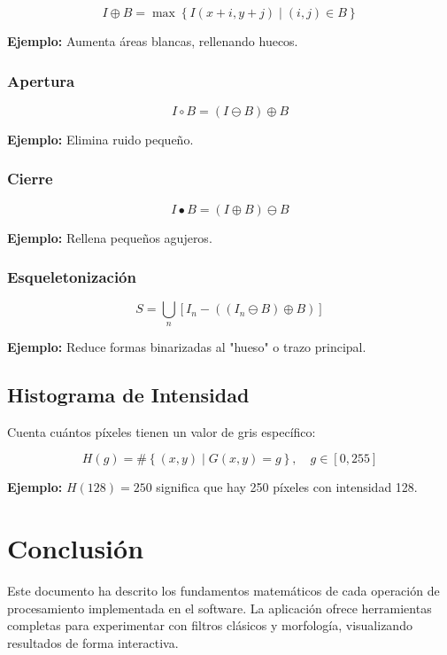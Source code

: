 \documentclass[12pt]{article}
\begin{document}
\[
I \oplus B = \max \left\{ I(x+i, y+j) \mid (i,j) \in B \right\}
\]

\textbf{Ejemplo:}  
Aumenta áreas blancas, rellenando huecos.

\subsubsection{Apertura}

\[
I \circ B = (I \ominus B) \oplus B
\]

\textbf{Ejemplo:}  
Elimina ruido pequeño.

\subsubsection{Cierre}

\[
I \bullet B = (I \oplus B) \ominus B
\]

\textbf{Ejemplo:}  
Rellena pequeños agujeros.

\subsubsection{Esqueletonización}

\[
S = \bigcup_n \left[ I_n - ((I_n \ominus B) \oplus B) \right]
\]

\textbf{Ejemplo:}  
Reduce formas binarizadas al "hueso" o trazo principal.

\subsection{Histograma de Intensidad}

Cuenta cuántos píxeles tienen un valor de gris específico:

\[
H(g) = \#\left\{(x, y) \mid G(x, y) = g \right\}, \quad g \in [0, 255]
\]

\textbf{Ejemplo:}  
$H(128) = 250$ significa que hay 250 píxeles con intensidad 128.

\section{Conclusión}

Este documento ha descrito los fundamentos matemáticos de cada operación de procesamiento implementada en el software. La aplicación ofrece herramientas completas para experimentar con filtros clásicos y morfología, visualizando resultados de forma interactiva.
\end{document}
